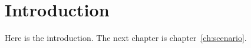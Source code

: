 \chapter{Introduction}\label{ch:introduction}
Here is the introduction. The next chapter is chapter~\ref{ch:scenario}.

